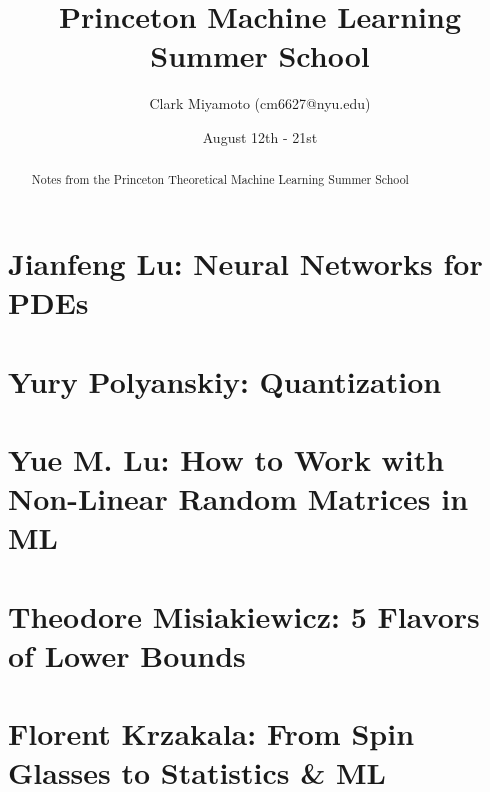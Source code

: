 \documentclass[12pt,fleqn]{article}
\title{Princeton Machine Learning Summer School}
\author{Clark Miyamoto (cm6627@nyu.edu)}
\date{August 12th - 21st}
\numberwithin{equation}{section} %
\begin{document}
\maketitle


\begin{abstract}
	Notes from the Princeton Theoretical Machine Learning Summer School
\end{abstract}

\part{Jianfeng Lu: Neural Networks for PDEs}

\newpage

\part{Yury Polyanskiy: Quantization}

\newpage

\part{Yue M. Lu: How to Work with Non-Linear Random Matrices in ML}

\newpage

\part{Theodore Misiakiewicz: 5 Flavors of Lower Bounds}

\newpage

\part{Florent Krzakala: From Spin Glasses to Statistics \& ML}

\newpage
\end{document}
